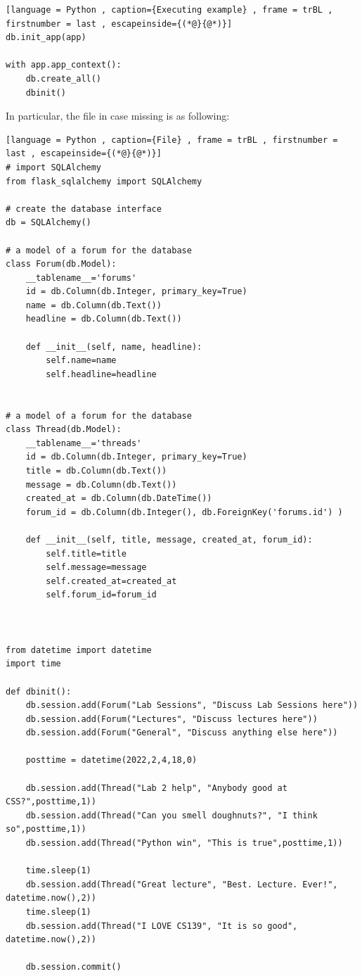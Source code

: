\documentclass[a4paper]{article}
\theoremstyle{plain}
\theoremstyle{definition}
\theoremstyle{remark}
\begin{document}
\begin{flushleft}
\begin{lstlisting}[language = Python , caption={Executing example} , frame = trBL , firstnumber = last , escapeinside={(*@}{@*)}]
db.init_app(app)

with app.app_context():
	db.create_all()
	dbinit()
\end{lstlisting}
In particular, the file in case missing is as following:
\begin{lstlisting}[language = Python , caption={File} , frame = trBL , firstnumber = last , escapeinside={(*@}{@*)}]
# import SQLAlchemy
from flask_sqlalchemy import SQLAlchemy

# create the database interface
db = SQLAlchemy()

# a model of a forum for the database
class Forum(db.Model):
    __tablename__='forums'
    id = db.Column(db.Integer, primary_key=True)
    name = db.Column(db.Text())
    headline = db.Column(db.Text())

    def __init__(self, name, headline):
        self.name=name
        self.headline=headline


# a model of a forum for the database
class Thread(db.Model):
    __tablename__='threads'
    id = db.Column(db.Integer, primary_key=True)
    title = db.Column(db.Text())
    message = db.Column(db.Text())
    created_at = db.Column(db.DateTime())
    forum_id = db.Column(db.Integer(), db.ForeignKey('forums.id') )

    def __init__(self, title, message, created_at, forum_id):
        self.title=title
        self.message=message
        self.created_at=created_at
        self.forum_id=forum_id



from datetime import datetime
import time

def dbinit():
    db.session.add(Forum("Lab Sessions", "Discuss Lab Sessions here"))
    db.session.add(Forum("Lectures", "Discuss lectures here"))
    db.session.add(Forum("General", "Discuss anything else here"))

    posttime = datetime(2022,2,4,18,0)
    
    db.session.add(Thread("Lab 2 help", "Anybody good at CSS?",posttime,1))
    db.session.add(Thread("Can you smell doughnuts?", "I think so",posttime,1))
    db.session.add(Thread("Python win", "This is true",posttime,1))

    time.sleep(1)
    db.session.add(Thread("Great lecture", "Best. Lecture. Ever!", datetime.now(),2))
    time.sleep(1)
    db.session.add(Thread("I LOVE CS139", "It is so good", datetime.now(),2))

    db.session.commit()
\end{lstlisting}

\end{flushleft}
\end{document}
